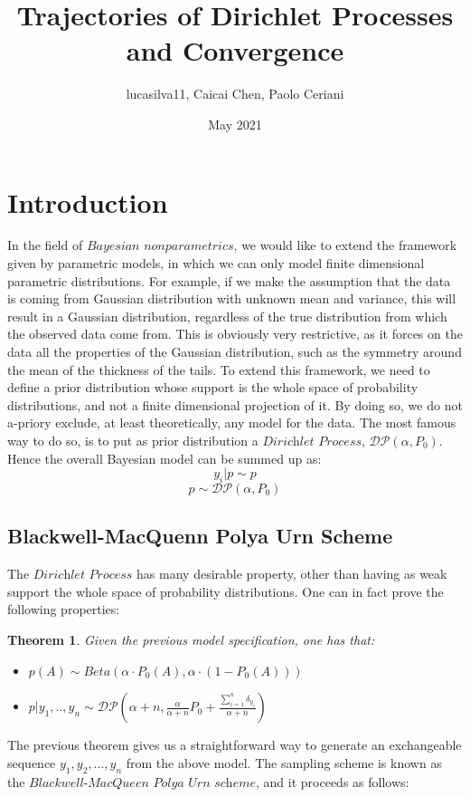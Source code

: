 \documentclass{article}
\title{Trajectories of Dirichlet Processes and Convergence}
\author{lucasilva11, Caicai Chen, Paolo Ceriani }
\date{May 2021}
\newtheorem{theorem}{Theorem}
\begin{document}
\maketitle
\section{Introduction}
In the field of $\textit{Bayesian nonparametrics}$, we would like to extend the framework given by parametric models, in which we can only model finite dimensional parametric distributions. For example, if we make the assumption that the data is coming from Gaussian distribution with unknown mean and variance, this will result in a Gaussian distribution, regardless of the true distribution from which the observed data come from. This is obviously very restrictive, as it forces on the data all the properties of the Gaussian distribution, such as the symmetry around the mean of the thickness of the tails. To extend this framework, we need to define a prior distribution whose support is the whole space of probability distributions, and not a finite dimensional projection of it. By doing so, we do not a-priory exclude, at least theoretically, any model for the data. 
The most famous way to do so, is to put as prior distribution a $\textit{Dirichlet Process}$, $\mathcal{DP}(\alpha, P_0)$.
Hence the overall Bayesian model can be summed up as:
\[ y_i|p\sim p \]
\[p\sim \mathcal{DP}(\alpha, P_0) \]


\subsection{Blackwell-MacQuenn Polya Urn Scheme}

The $\textit{Dirichlet Process}$ has many desirable property, other than having as weak support the whole space of probability distributions. One can in fact prove the following properties:
\begin{theorem}
\label{thm:1}
Given the previous model specification, one has that:
\begin{itemize}
\item {$p(A)\sim Beta(\alpha\cdot P_0(A), \alpha\cdot(1-P_0(A)))$}
\item {$p|y_1,..,y_n\sim\mathcal{DP}(\alpha+n, \frac{\alpha}{\alpha+n}P_0+\frac{\sum_{i=1}^n\delta_{y_i}}{\alpha+n})$}
\end{itemize}
\end{theorem}

The previous theorem gives us a straightforward way to generate an exchangeable sequence $y_1, y_2,..., y_n$ from the above model. The sampling scheme is known as the $\textit{Blackwell-MacQueen Polya Urn scheme}$, and it proceeds as follows:
\end{document}
